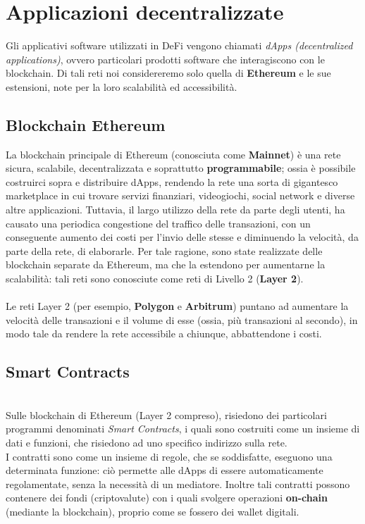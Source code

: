 \documentclass[12pt,a4paper]{report}
\begin{document}
\section{Applicazioni decentralizzate}
Gli applicativi software utilizzati in DeFi vengono chiamati \textit{dApps (decentralized applications)}, ovvero particolari prodotti software che interagiscono con le blockchain. Di tali reti noi considereremo solo quella di \textbf{Ethereum}\cite{ethereum} e le sue estensioni, note per la loro scalabilità ed accessibilità.


\subsection{Blockchain Ethereum}
La blockchain principale di Ethereum (conosciuta come \textbf{Mainnet}) è una rete sicura, scalabile, decentralizzata e soprattutto \textbf{programmabile}; ossia è possibile costruirci sopra e distribuire dApps, rendendo la rete una sorta di gigantesco marketplace in cui trovare servizi finanziari, videogiochi, social network e diverse altre applicazioni. 
Tuttavia, il largo utilizzo della rete da parte degli utenti, ha causato una periodica congestione del traffico delle transazioni, con un conseguente aumento dei costi per l'invio delle stesse e diminuendo la velocità, da parte della rete, di elaborarle.
Per tale ragione, sono state realizzate delle blockchain separate da Ethereum, ma che la estendono per aumentarne la scalabilità: tali reti sono conosciute come reti di Livello 2 (\textbf{Layer 2}).
\\\\Le reti Layer 2 (per esempio, \textbf{Polygon}\cite{polygon} e \textbf{Arbitrum}\cite{arbitrum}) puntano ad aumentare la velocità delle transazioni e il volume di esse (ossia, più transazioni al secondo), in modo tale da rendere la rete accessibile a chiunque, abbattendone i costi.

\subsection{Smart Contracts}
\\Sulle blockchain di Ethereum (Layer 2 compreso), risiedono dei particolari programmi denominati \textit{Smart Contracts}\cite{smartcontracts}, i quali sono costruiti come un insieme di dati e funzioni, che risiedono ad uno specifico indirizzo sulla rete.
\\I contratti sono come un insieme di regole, che se soddisfatte, eseguono una determinata funzione: ciò permette alle dApps di essere automaticamente regolamentate, senza la necessità di un mediatore. Inoltre tali contratti possono contenere dei fondi (criptovalute) con i quali svolgere operazioni \textbf{on-chain} (mediante la blockchain), proprio come se fossero dei wallet digitali.
\end{document}
